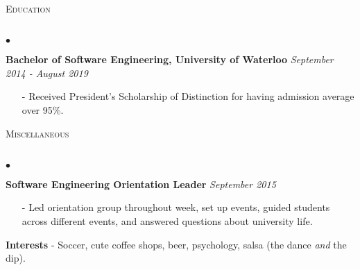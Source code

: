 \documentclass[11pt]{article}
\newcommand{\lineunder}{\vspace*{-8pt} \\ \hspace*{-18pt} \hrulefill \\}
\newcommand{\header}[1]{{\hspace*{-15pt}\vspace*{6pt} \textsc{#1}} \vspace*{-6pt} \lineunder }
\newenvironment{achievements}{\begin{list}{$\bullet$}{\topsep 0pt \itemsep -1.5pt \leftmargin 5pt}}{\vspace*{4pt}\end{list}}
\begin{document}
\vspace{4pt}

\header{\fontsize{11.1}{10}\selectfont  Education}
\begin{achievements}
\item \textbf{Bachelor of Software Engineering, University of Waterloo} \hfill \textit {September 2014 - August 2019}
\begin{itemize}
\vspace{2pt}
\item[-]Received President's Scholarship of Distinction for having admission average over 95\%.
\vspace{2pt}
\end{itemize}
\end{achievements}

\vspace{4pt}

\header{\fontsize{11.1}{10}\selectfont Miscellaneous}
\begin{achievements}
\item \textbf{Software Engineering Orientation Leader} \hfill \textit {September 2015}
\begin{itemize}
\item[-] Led orientation group throughout week, set up events, guided students across different events, and answered questions about university life.
\end{itemize}
\vspace{2pt}
\item \textbf{Interests} - Soccer, cute coffee shops, beer, psychology, salsa (the dance \textit{and} the dip).
\vspace{2pt}
\end{achievements}
\end{document}
